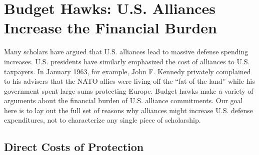 \section*{Budget Hawks: U.S. Alliances Increase the Financial Burden}


Many scholars have argued that U.S. alliances lead to massive defense spending increases.\autocite{gholzSS01,layneCRIA11,friedmanO12} U.S. presidents have similarly emphasized the cost of alliances to U.S. taxpayers. In January 1963, for example, John F. Kennedy privately complained to his advisers that the NATO allies were living off the ``fat of the land'' while his government spent large sums protecting Europe.\autocite{fruskennedy, creswellWOTR17} Budget hawks make a variety of arguments about the financial burden of U.S. alliance commitments. Our goal here is to lay out the full set of reasons why alliances might increase U.S. defense expenditures, not to characterize any single piece of scholarship.



\subsection*{Direct Costs of Protection}

